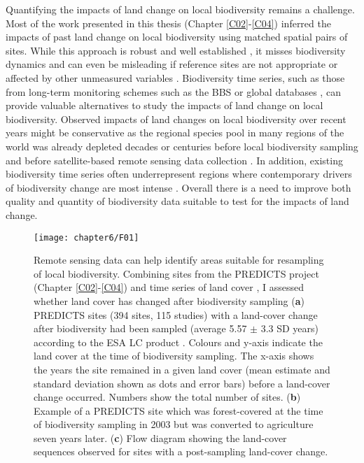Quantifying the impacts of land change on local biodiversity remains a challenge. Most of the work presented in this thesis (Chapter \ref{C02}-\ref{C04}) inferred the impacts of past land change on local biodiversity using matched spatial pairs of sites. While this approach is robust and well established \citep{Purvis2018}, it misses biodiversity dynamics and can even be misleading if reference sites are not appropriate or affected by other unmeasured variables \citep{Franca2016,Jung2016,DePalma2018}. Biodiversity time series, such as those from long-term monitoring schemes such as the BBS \citep{Pardieck2018} or global databases \citep[\eg BioTime, ][]{Dornelas2018}, can provide valuable alternatives to study the impacts of land change on local biodiversity. Observed impacts of land changes on local biodiversity over recent years might be conservative as the regional species pool in many regions of the world was already depleted decades or centuries before local biodiversity sampling and before satellite-based remote sensing data collection \citep{Newbold2016a,Mihoub2017}. In addition, existing biodiversity time series often underrepresent regions where contemporary drivers of biodiversity change are most intense \citep{Gonzalez2016,Cardinale2018}. Overall there is a need to improve both quality and quantity of biodiversity data suitable to test for the impacts of land change.

\begin{figure}[ht]
\centering
\texttt{[image: chapter6/F01]}
\caption{ Remote sensing data can help identify areas suitable for resampling of local biodiversity. Combining sites from the PREDICTS project (Chapter \ref{C02}-\ref{C04}) and time series of land cover \citep{ESA2017}, I assessed whether land cover has changed after biodiversity sampling (\textbf{a}) PREDICTS sites (394 sites, 115 studies) with a land-cover change after biodiversity had been sampled (average 5.57 $\pm$ 3.3 SD years) according to the ESA LC product \citep{ESA2017}. Colours and y-axis indicate the land cover at the time of biodiversity sampling. The x-axis shows the years the site remained in a given land cover (mean estimate and standard deviation shown as dots and error bars) before a land-cover change occurred. Numbers show the total number of sites. (\textbf{b}) Example of a PREDICTS site which was forest-covered at the time of biodiversity sampling in 2003 but was converted to agriculture seven years later. (\textbf{c}) Flow diagram showing the land-cover sequences observed for sites with a post-sampling land-cover change.}
\label{F06_01}
\end{figure}

